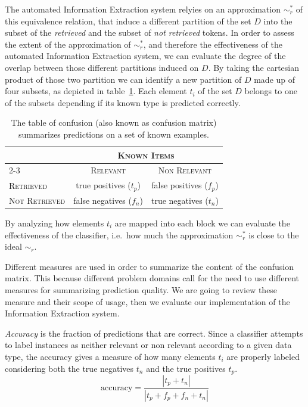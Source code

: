 The automated Information Extraction system relyies on an approximation $\sim_r^*$ of this equivalence relation, that induce a different partition of the set $D$ into the subset of the \emph{retrieved} and the subset of \emph{not retrieved} tokens. In order to assess the extent of the approximation of $\sim_r^*$, and therefore the effectiveness of the automated Information Extraction system, we can evaluate the degree of the overlap between those different partitions induced on $D$. By taking the cartesian product of those two partition we can identify a new partition of $D$ made up of four subsets, as depicted in table~\ref{tab:relevant_retrieved_partition}. Each element $t_i$ of the set $D$ belongs to one of the subsets depending if its known type is predicted correctly.

\begin{table}
 \centering
 \begin{tabular}{lcc}
 \toprule
   & \multicolumn{2}{c}{\textsc{Known Items}}\\
\cline{2-3}
   & \textsc{Relevant} & \textsc{Non Relevant}\\
 \midrule
 \textsc{Retrieved}     & true positives ($t_p$)  & false positives ($f_p$)\\
 \textsc{Not Retrieved} & false negatives ($f_n$) & true negatives ($t_n$)\\
 \bottomrule
 \end{tabular}
 \caption{The table of confusion (also known as confusion matrix) summarizes predictions on a set of known examples.}
 \label{tab:relevant_retrieved_partition}
\end{table}

By analyzing how elements $t_i$ are mapped into each block we can evaluate the effectiveness of the classifier, i.e.\ how much the approximation $\sim_r^*$ is close to the ideal $\sim_r$.

Different measures \cite{manning2008iir} are used in order to summarize the content of the confusion matrix. This because different problem domains call for the need to use different measures for summarizing prediction quality. We are going to review these measure and their scope of usage, then we evaluate our implementation of the Information Extraction system.

\emph{Accuracy} is the fraction of predictions that are correct. Since a classifier attempts to label instances as neither relevant or non relevant according to a given data type, the accuracy gives a measure of how many elements $t_i$ are properly labeled considering both the true negatives $t_n$ and the true positives $t_p$.
\begin{equation}
 \mbox{accuracy} = \frac{|t_p+t_n|}{|t_p+f_p+f_n+t_n|}
\end{equation}

